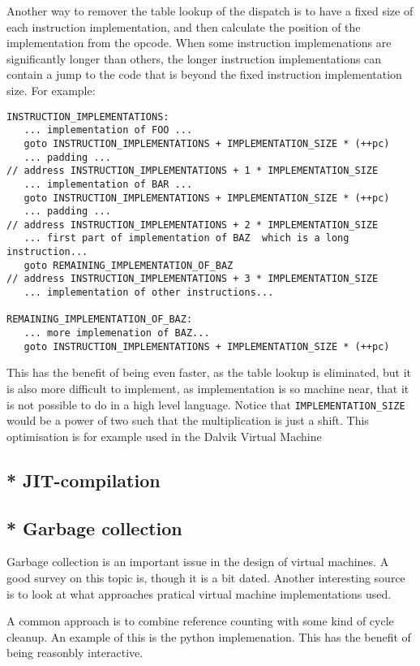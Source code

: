 Another way to remover the table lookup of the dispatch is to have a fixed size of each instruction implementation, and then calculate the position of the implementation from the opcode. When some instruction implemenations are significantly longer than others, the longer instruction implementations can contain a jump to the code that is beyond the fixed instruction implementation size.
For example:
\begin{verbatim}
INSTRUCTION_IMPLEMENTATIONS:
   ... implementation of FOO ...
   goto INSTRUCTION_IMPLEMENTATIONS + IMPLEMENTATION_SIZE * (++pc)
   ... padding ...
// address INSTRUCTION_IMPLEMENTATIONS + 1 * IMPLEMENTATION_SIZE
   ... implementation of BAR ...
   goto INSTRUCTION_IMPLEMENTATIONS + IMPLEMENTATION_SIZE * (++pc)
   ... padding ...
// address INSTRUCTION_IMPLEMENTATIONS + 2 * IMPLEMENTATION_SIZE
   ... first part of implementation of BAZ  which is a long instruction...
   goto REMAINING_IMPLEMENTATION_OF_BAZ
// address INSTRUCTION_IMPLEMENTATIONS + 3 * IMPLEMENTATION_SIZE
   ... implementation of other instructions...

REMAINING_IMPLEMENTATION_OF_BAZ:
   ... more implemenation of BAZ...
   goto INSTRUCTION_IMPLEMENTATIONS + IMPLEMENTATION_SIZE * (++pc)
\end{verbatim}
This has the benefit of being even faster, as the table lookup is eliminated,
but it is also more difficult to implement, as implementation is so 
machine near, that it is not possible to do in a high level language.
Notice that \verb|IMPLEMENTATION_SIZE| would be a power of two such that the multiplication is just a shift.
This optimisation is for example used in the Dalvik Virtual Machine\cite{dalvik-vm}


\subsection{* JIT-compilation}

\subsection{* Garbage collection}
Garbage collection is an important issue in the design of virtual machines. 
A good survey on this topic is\cite{gc-survey}, though it is a bit dated.
Another interesting source is to look at what approaches pratical virtual machine implementations used.

A common approach is to combine reference counting with some kind of cycle cleanup. 
An example of this is the python implemenation. 
This has the benefit of being reasonbly interactive. 

